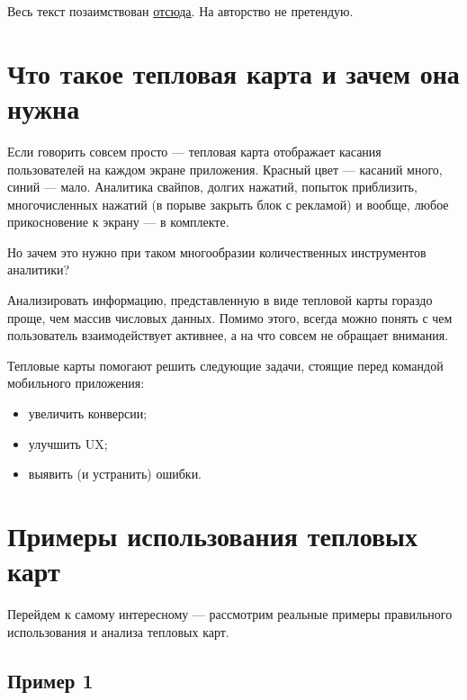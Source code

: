 \documentclass{article}
\begin{document}
\maketitle

\begin{disclaimer}
Весь текст позаимствован \href{https://vc.ru/design/223623-teplovye-karty-zachem-nuzhny-v-mobilnyh-prilozheniyah-i-primery-ispolzovaniya}{отсюда}. На авторство не претендую.
\end{disclaimer}

\section{Что такое тепловая карта и зачем она нужна}

Если говорить совсем просто — тепловая карта отображает касания пользователей на каждом экране приложения. Красный цвет — касаний много, синий — мало. Аналитика свайпов, долгих нажатий, попыток приблизить, многочисленных нажатий (в порыве закрыть блок с рекламой) и вообще, любое прикосновение к экрану — в комплекте.

Но зачем это нужно при таком многообразии количественных инструментов аналитики?

Анализировать информацию, представленную в виде тепловой карты гораздо проще, чем массив числовых данных. Помимо этого, всегда можно понять с чем пользователь взаимодействует активнее, а на что совсем не обращает внимания.

Тепловые карты помогают решить следующие задачи, стоящие перед командой мобильного приложения:

\begin{itemize}
\item увеличить конверсии;
\item улучшить UX;
\item выявить (и устранить) ошибки.
\end{itemize}

\section{Примеры использования тепловых карт}

Перейдем к самому интересному — рассмотрим реальные примеры правильного использования и анализа тепловых карт.

\subsection{Пример 1}
\end{document}
